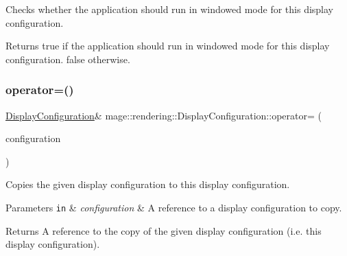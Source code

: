 Checks whether the application should run in windowed mode for this display configuration.

\begin{DoxyReturn}{Returns}
{\ttfamily true} if the application should run in windowed mode for this display configuration. {\ttfamily false} otherwise. 
\end{DoxyReturn}
\mbox{\label{classmage_1_1rendering_1_1_display_configuration_a847151bc6a61f320811e915119f38f9f}} 
\subsubsection{\texorpdfstring{operator=()}{operator=()}\hspace{0.1cm}{\footnotesize\ttfamily [1/2]}}
{\footnotesize\ttfamily \mbox{\hyperlink{classmage_1_1rendering_1_1_display_configuration}{Display\+Configuration}}\& mage\+::rendering\+::\+Display\+Configuration\+::operator= (\begin{DoxyParamCaption}\item[{const \mbox{\hyperlink{classmage_1_1rendering_1_1_display_configuration}{Display\+Configuration}} \&}]{configuration }\end{DoxyParamCaption})\hspace{0.3cm}{\ttfamily [default]}}

Copies the given display configuration to this display configuration.


\begin{DoxyParams}[1]{Parameters}
\mbox{\tt in}  & {\em configuration} & A reference to a display configuration to copy. \\
\hline
\end{DoxyParams}
\begin{DoxyReturn}{Returns}
A reference to the copy of the given display configuration (i.\+e. this display configuration). 
\end{DoxyReturn}
\mbox{\label{classmage_1_1rendering_1_1_display_configuration_a309591557673c77b7157012136fe2fc9}} 
